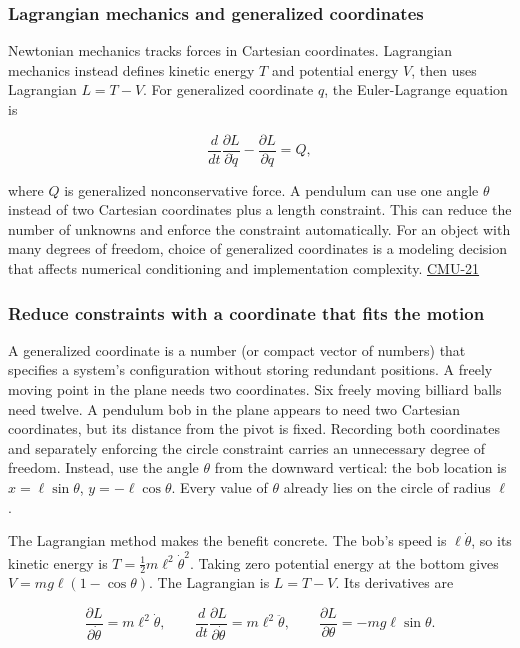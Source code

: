 \subsubsection{Lagrangian mechanics and generalized coordinates}\label{lagrangian-mechanics-and-generalized-coordinates}

Newtonian mechanics tracks forces in Cartesian coordinates. Lagrangian mechanics instead defines kinetic energy \(T\) and potential energy \(V\), then uses Lagrangian \(L=T-V\). For generalized coordinate \(q\), the Euler-Lagrange equation is

\[
\frac{d}{dt}\frac{\partial L}{\partial\dot q}-\frac{\partial L}{\partial q}=Q,
\]

where \(Q\) is generalized nonconservative force. A pendulum can use one angle \(\theta\) instead of two Cartesian coordinates plus a length constraint. This can reduce the number of unknowns and enforce the constraint automatically. For an object with many degrees of freedom, choice of generalized coordinates is a modeling decision that affects numerical conditioning and implementation complexity. \hyperref[04-visual-computing-ii-ch036]{CMU-21}

\subsubsection{Reduce constraints with a coordinate that fits the motion}\label{reduce-constraints-with-a-coordinate-that-fits-the-motion}

A generalized coordinate is a number (or compact vector of numbers) that specifies a system's configuration without storing redundant positions. A freely moving point in the plane needs two coordinates. Six freely moving billiard balls need twelve. A pendulum bob in the plane appears to need two Cartesian coordinates, but its distance from the pivot is fixed. Recording both coordinates and separately enforcing the circle constraint carries an unnecessary degree of freedom. Instead, use the angle \(\theta\) from the downward vertical: the bob location is \(x=\ell\sin\theta\), \(y=-\ell\cos\theta\). Every value of \(\theta\) already lies on the circle of radius \(\ell\).

The Lagrangian method makes the benefit concrete. The bob's speed is \(\ell\dot\theta\), so its kinetic energy is \(T=\tfrac12m\ell^2\dot\theta^2\). Taking zero potential energy at the bottom gives \(V=mg\ell(1-\cos\theta)\). The Lagrangian is \(L=T-V\). Its derivatives are

\[
\frac{\partial L}{\partial\dot\theta}=m\ell^2\dot\theta,\qquad
\frac{d}{dt}\frac{\partial L}{\partial\dot\theta}=m\ell^2\ddot\theta,\qquad
\frac{\partial L}{\partial\theta}=-mg\ell\sin\theta.
\]

